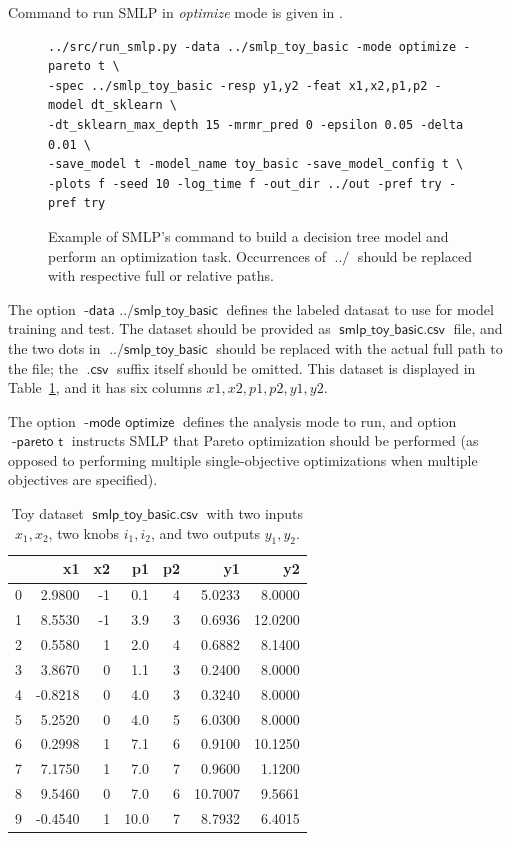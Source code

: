 \documentclass[a4paper,parskip=half]{article} %
\newcommand*\option[1]{\operatorname{\mathsf{#1}}} %
\newcommand*\optionval[2]{\operatorname{\mathsf{#1}\,\,\mathsf{#2}}} %
\newcommand*\suffix[1]{\operatorname{\mathsf{#1}}} %
\begin{document}
Command to run SMLP in \emph{optimize} mode is given in .

\begin{figure}[hb!]
\begin{verbatim}
../src/run_smlp.py -data ../smlp_toy_basic -mode optimize -pareto t \
-spec ../smlp_toy_basic -resp y1,y2 -feat x1,x2,p1,p2 -model dt_sklearn \
-dt_sklearn_max_depth 15 -mrmr_pred 0 -epsilon 0.05 -delta 0.01 \
-save_model t -model_name toy_basic -save_model_config t \
-plots f -seed 10 -log_time f -out_dir ../out -pref try -pref try
\end{verbatim}
\caption{Example of SMLP's command to build a decision tree model and perform an optimization task. 
Occurrences of $\suffix{../}$ should be replaced with respective full or relative paths.}
\label{fig:command}
\end{figure}

The option $\optionval{-data}{../smlp\_toy\_basic}$ defines the labeled datasat to use for model training and test.
The dataset should be provided as $\option{smlp\_toy\_basic.csv}$ file, and the two dots in $\option{../smlp\_toy\_basic}$ 
should be replaced with the actual full path to the file;  the $\suffix{.csv}$ suffix itself should be omitted.
This dataset is displayed in Table~\ref{toy_basic_df}, and it has six columns $x1, x2, p1, p2, y1, y2$.

The option $\optionval{-mode}{optimize}$ defines the analysis mode to run, and option $\optionval{-pareto}{t}$
instructs SMLP that Pareto optimization should be performed (as opposed to performing multiple single-objective 
optimizations when multiple objectives are specified). 

\begin{table}[t]
\centering\small
\begin{tabular}{lrrrrrr}
\toprule %
{} &      x1 &  x2 &    p1 &  p2 &       y1 &       y2 \\
\midrule
0 &  2.9800 &  -1 &   0.1 &   4 &   5.0233 &   8.0000 \\
1 &  8.5530 &  -1 &   3.9 &   3 &   0.6936 &  12.0200 \\
2 &  0.5580 &   1 &   2.0 &   4 &   0.6882 &   8.1400 \\
3 &  3.8670 &   0 &   1.1 &   3 &   0.2400 &   8.0000 \\
4 & -0.8218 &   0 &   4.0 &   3 &   0.3240 &   8.0000 \\
5 &  5.2520 &   0 &   4.0 &   5 &   6.0300 &   8.0000 \\
6 &  0.2998 &   1 &   7.1 &   6 &   0.9100 &  10.1250 \\
7 &  7.1750 &   1 &   7.0 &   7 &   0.9600 &   1.1200 \\
8 &  9.5460 &   0 &   7.0 &   6 &  10.7007 &   9.5661 \\
9 & -0.4540 &   1 &  10.0 &   7 &   8.7932 &   6.4015 \\
\bottomrule
\end{tabular}
\caption{Toy dataset $\option{smlp\_toy\_basic.csv}$ with two inputs $x_1, x_2$, two knobs $i_1, i_2$, and two outputs $y_1, y_2$.}
\label{toy_basic_df}
\end{table}
\end{document}
